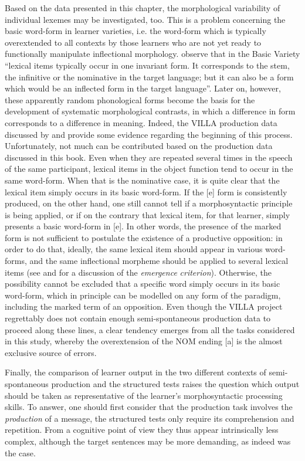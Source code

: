 Based on the data presented in this chapter, the morphological variability of individual lexemes may be investigated, too. This is a problem concerning the basic word-form in learner varieties, i.e. the word-form which is typically overextended to all contexts by those learners who are not yet ready to functionally manipulate inflectional morphology. \citet[311]{KleinPerdue1997} observe that in the Basic Variety “lexical items typically occur in one invariant form. It corresponds to the stem, the infinitive or the nominative in the target language; but it can also be a form which would be an inflected form in the target language”. Later on, however, these apparently random phonological forms become the basis for the development of systematic morphological contrasts, in which a difference in form corresponds to a difference in meaning. Indeed, the VILLA production data discussed by \citet{Bernini2018} and \citet[28--33]{Dimroth2018} provide some evidence regarding the beginning of this process. Unfortunately, not much can be contributed based on the production data discussed in this book. Even when they are repeated several times in the speech of the same participant, lexical items in the object function tend to occur in the same word-form. When that is the nominative case, it is quite clear that the lexical item simply occurs in its basic word-form. If the [e] form is consistently produced, on the other hand, one still cannot tell if a morphosyntactic principle is being applied, or if on the contrary that lexical item, for that learner, simply presents a basic word-form in [e]. In other  words, the presence of the marked form is not sufficient to postulate the existence of a productive opposition: in order to do that, ideally, the same lexical item should appear in various word-forms, and the same inflectional morpheme should be applied to several lexical items (see \citealt{Pienemann1998} and \citealt{Pallotti2007} for a discussion of the \textit{emergence} \textit{criterion}). Otherwise, the possibility cannot be excluded that a specific word simply occurs in its basic word-form, which in principle can be modelled on any form of the paradigm, including the marked term of an opposition. Even though the VILLA project regrettably does not contain enough semi-spontaneous production data to proceed along these lines, a clear tendency emerges from all the tasks considered in this study, whereby the overextension of the NOM ending [a] is the almost exclusive source of errors.

Finally, the comparison of learner output in the two different contexts of semi-spontaneous  production and the structured tests raises the question which output should be taken as representative of the learner's morphosyntactic processing skills. To answer, one should first consider that the production task involves the \textit{production} of a message, the structured tests only require its comprehension and repetition. From a cognitive point of view they thus appear intrinsically less complex, although the target sentences may be more demanding, as indeed was the case. 

